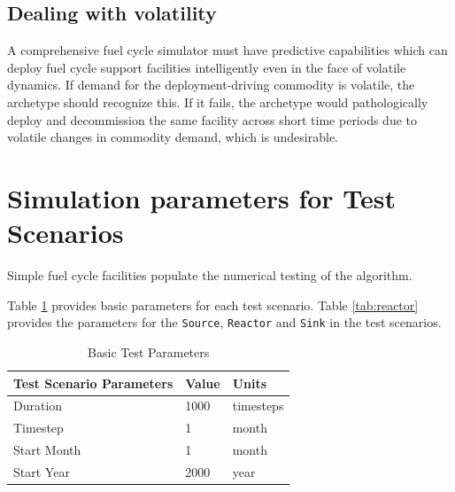 \documentclass[11pt,letterpaper]{article}
\begin{document}
 \subsection{Dealing with volatility}
 \label{subsection-volatile}
A comprehensive fuel cycle simulator must have predictive capabilities which 
can deploy fuel cycle support facilities intelligently even in the face of 
volatile dynamics. If demand for the deployment-driving commodity is volatile, 
the archetype should recognize this. If it fails, the archetype would pathologically
deploy and decommission the same facility across short time periods due to volatile changes in commodity demand,
which is undesirable. 

\section{Simulation parameters for Test Scenarios}
Simple fuel cycle facilities populate the numerical testing of the algorithm.   

Table \ref{tab:testscenario} provides basic parameters for each test scenario. Table \ref{tab:reactor} provides the parameters for the \texttt{Source}, \texttt{Reactor} and \texttt{Sink} in the test scenarios.

\begin{table}[H]
	\centering
	\caption {Basic Test Parameters}
	\label{tab:testscenario}
	\begin{tabular}{|l|l|l|}
		\hline
		\textbf{Test Scenario Parameters} & \textbf{Value} & \textbf{Units} \\
		\hline
		Duration & 1000 & timesteps \\
		Timestep & 1 & month \\
		Start Month & 1 & month \\
		Start Year & 2000 & year \\
		\hline
	\end{tabular}
\end{table}
\end{document}
